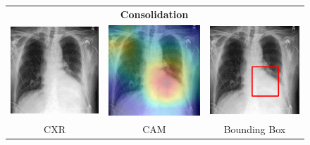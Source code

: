 \begin{figure}[htbp!]
\centering
\begin{tabular}{ccc}
 &\textbf{Consolidation}& \\
\vspace{2mm}
  \includegraphics[width=35mm]{Tesi/images/CAMs/CAM9/image.png} &   
  \includegraphics[width=35mm]{Tesi/images/CAMs/CAM9/image_cam.png} &   
  \includegraphics[width=35mm]{Tesi/images/CAMs/CAM9/image_bbox.png} \\
\footnotesize{CXR} & \footnotesize{CAM} & \footnotesize{Bounding Box} \\[6pt]
\end{tabular}
\caption[Consolidation CAM-2]{}
\label{fig:figure_5.23}
\end{figure}

